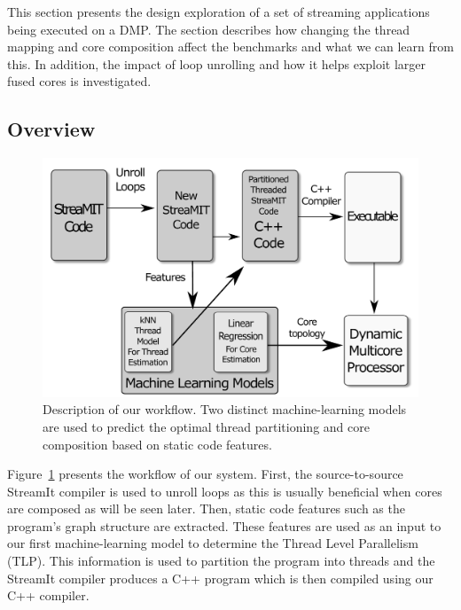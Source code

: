 This section presents the design exploration of a set of streaming applications being executed on a DMP.
The section describes how changing the thread mapping and core composition affect the benchmarks and what we can learn from this.
In addition, the impact of loop unrolling and how it helps exploit larger fused cores is investigated.

\subsection{Overview}

\begin{figure}[t]
    \centering
    \includegraphics[width=1\textwidth]{streamit-paper/graphics/explanation.pdf}
    \caption{Description of our workflow.
    Two distinct machine-learning models are used to predict the optimal thread partitioning and core composition based on static code features.}
    \label{fig:overview}
\end{figure}

Figure~\ref{fig:overview} presents the workflow of our system.
First, the source-to-source StreamIt compiler is used to unroll loops as this is usually beneficial when cores are composed as will be seen later.
Then, static code features such as the program's graph structure are extracted.
These features are used as an input to our first machine-learning model to determine the Thread Level Parallelism (TLP).
This information is used to partition the program into threads and the StreamIt compiler produces a C++ program which  is then compiled using our C++ compiler.

